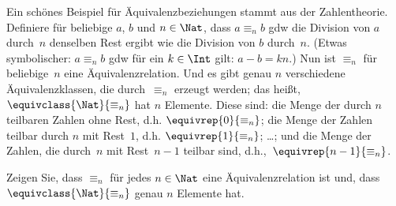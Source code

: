 \documentclass[../../../include/open-logic-section]{subfiles}
\begin{document}
\begin{ex}
Ein schönes Beispiel für Äquivalenzbeziehungen stammt aus der Zahlentheorie.
Definiere für beliebige $a$, $b$ und $n \in \Nat$, dass $a \equiv_n b$ gdw
die Division von $a$ durch~$n$ denselben Rest ergibt wie die Division von $b$ durch~$n$.
(Etwas symbolischer: $a \equiv_n b$ gdw für ein $k \in
\Int$ gilt: $a - b = kn$.) Nun ist $\equiv_n$ für beliebige~$n$ eine Äquivalenzrelation.
Und es gibt genau $n$ verschiedene Äquivalenzklassen,
die durch~$\equiv_n$ erzeugt werden; das heißt, $\equivclass{\Nat}{\equiv_n}$ hat
$n$ Elemente. Diese sind: die Menge der durch $n$ teilbaren Zahlen
ohne Rest, d.h. $\equivrep{0}{\equiv_n}$; die Menge der Zahlen
teilbar durch $n$ mit Rest~$1$, d.h. $\equivrep{1}{\equiv_n}$;
\ldots; und die Menge der Zahlen, die durch~$n$ mit Rest~$n-1$ teilbar sind,
d.h.,~$\equivrep{n-1}{\equiv_n}$.
\end{ex}

\begin{prob}
Zeigen Sie, dass $\equiv_n$ für jedes $n \in
\Nat$ eine Äquivalenzrelation ist und, dass $\equivclass{\Nat}{\equiv_n}$
genau $n$ Elemente hat.
\end{prob}
\end{document}

